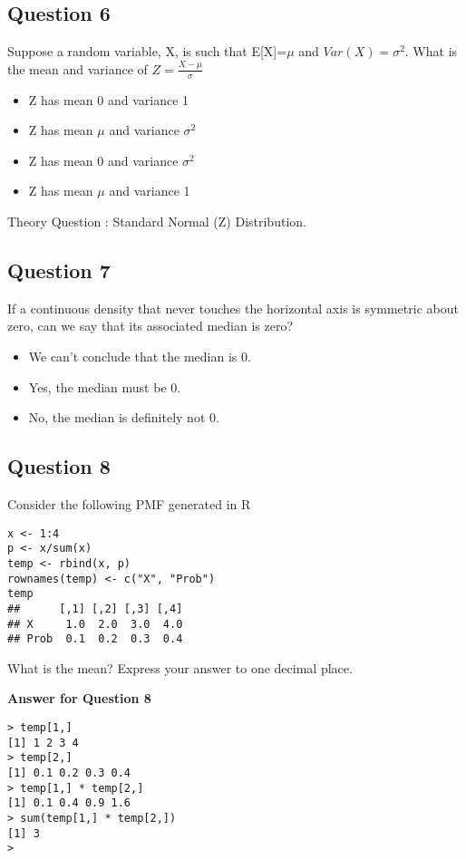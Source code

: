 \documentclass[]{article}
\begin{document}
\subsection{Question 6}
Suppose a random variable, X, is such that E[X]=$\mu$  and $Var(X)=\sigma^2$. 
What is the mean and variance of $Z= \frac{X−\mu}{\sigma}$

\begin{itemize}
\item Z has mean 0 and variance 1
\item Z has mean $\mu$ and variance $\sigma^2$
\item Z has mean 0 and variance $\sigma^2$
\item Z has mean $\mu$ and variance 1
\end{itemize}

Theory Question : Standard Normal (Z) Distribution.

\subsection{Question 7}
If a continuous density that never touches the horizontal axis is symmetric about zero, can we say that its associated median is zero?

\begin{itemize}
\item We can't conclude that the median is 0.
\item Yes, the median must be 0.
\item No, the median is definitely not 0.
\end{itemize}



\subsection{Question 8}
Consider the following PMF generated in R

\begin{verbatim}
x <- 1:4
p <- x/sum(x)
temp <- rbind(x, p)
rownames(temp) <- c("X", "Prob")
temp
##      [,1] [,2] [,3] [,4]
## X     1.0  2.0  3.0  4.0
## Prob  0.1  0.2  0.3  0.4
\end{verbatim}
What is the mean? Express your answer to one decimal place.

\textbf{Answer for Question 8}
\begin{verbatim}
> temp[1,]
[1] 1 2 3 4
> temp[2,]
[1] 0.1 0.2 0.3 0.4
> temp[1,] * temp[2,]
[1] 0.1 0.4 0.9 1.6
> sum(temp[1,] * temp[2,])
[1] 3
> 
\end{verbatim}
\end{document}
